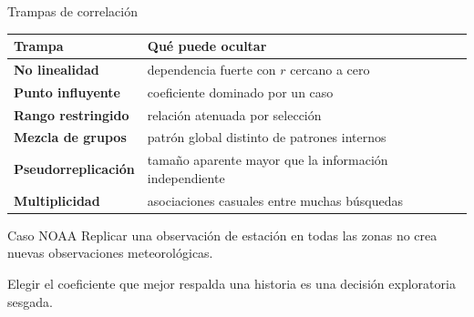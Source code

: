 \documentclass[aspectratio=169,11pt]{beamer}
\begin{document}
\begin{frame}{Trampas de correlación}
  \footnotesize
  \begin{tabularx}{\textwidth}{>{\bfseries}p{} X}
    \toprule
    Trampa & Qué puede ocultar \\
    \midrule
    No linealidad & dependencia fuerte con $r$ cercano a cero \\
    Punto influyente & coeficiente dominado por un caso \\
    Rango restringido & relación atenuada por selección \\
    Mezcla de grupos & patrón global distinto de patrones internos \\
    Pseudorreplicación & tamaño aparente mayor que la información independiente \\
    Multiplicidad & asociaciones casuales entre muchas búsquedas \\
    \bottomrule
  \end{tabularx}
  \vspace{.7em}
  \begin{block}{Caso NOAA}
    Replicar una observación de estación en todas las zonas no crea nuevas observaciones meteorológicas.
  \end{block}
  \centering Elegir el coeficiente que mejor respalda una historia es una decisión exploratoria sesgada.
\end{frame}
\end{document}
